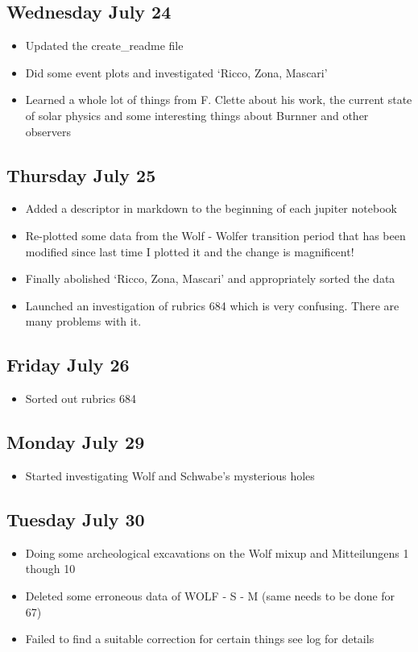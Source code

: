 \documentclass[12pt]{article}
\begin{document}
\subsection{Wednesday July 24}
\begin{itemize}
    \item Updated the create\_readme file
    \item Did some event plots and investigated `Ricco, Zona, Mascari'
    \item Learned a whole lot of things from F. Clette about his work, the current state of solar physics and some interesting things about Burnner and other observers
\end{itemize}

\subsection{Thursday July 25}
\begin{itemize}
    \item Added a descriptor in markdown to the beginning of each jupiter notebook
    \item Re-plotted some data from the Wolf - Wolfer transition period that has been modified since last time I plotted it and the change is magnificent! 
    \item Finally abolished `Ricco, Zona, Mascari' and appropriately sorted the data
    \item Launched an investigation of rubrics 684 which is very confusing. There are many problems with it.
\end{itemize}

\subsection{Friday July 26}
\begin{itemize}
    \item Sorted out rubrics 684
\end{itemize}

\subsection{Monday July 29}
\begin{itemize}
    \item Started investigating Wolf and Schwabe's mysterious holes
\end{itemize}

\subsection{Tuesday July 30}
\begin{itemize}
    \item Doing some archeological excavations on the Wolf mixup and Mitteilungens 1 though 10 
    \item Deleted some erroneous data of WOLF - S - M (same needs to be done for 67)
    \item Failed to find a suitable correction for certain things see log for details
\end{itemize}
\end{document}
